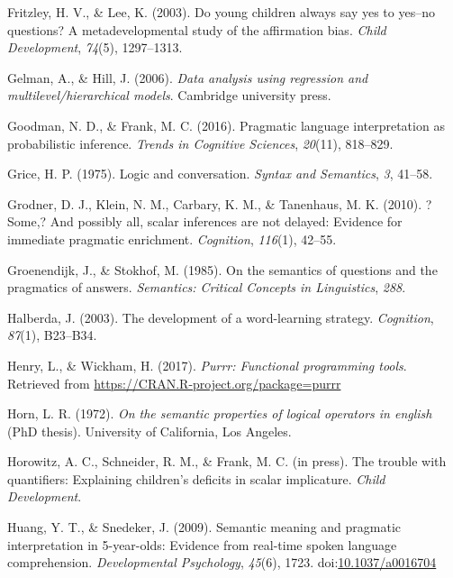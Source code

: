 \documentclass[man]{apa6}
\theoremstyle{definition}
\theoremstyle{definition}
\theoremstyle{definition}
\theoremstyle{remark}
\begin{document}
\hypertarget{ref-fritzley2003young}{}
Fritzley, H. V., \& Lee, K. (2003). Do young children always say yes to
yes--no questions? A metadevelopmental study of the affirmation bias.
\emph{Child Development}, \emph{74}(5), 1297--1313.

\hypertarget{ref-gelman2006data}{}
Gelman, A., \& Hill, J. (2006). \emph{Data analysis using regression and
multilevel/hierarchical models}. Cambridge university press.

\hypertarget{ref-goodman2016}{}
Goodman, N. D., \& Frank, M. C. (2016). Pragmatic language
interpretation as probabilistic inference. \emph{Trends in Cognitive
Sciences}, \emph{20}(11), 818--829.

\hypertarget{ref-grice1975logic}{}
Grice, H. P. (1975). Logic and conversation. \emph{Syntax and
Semantics}, \emph{3}, 41--58.

\hypertarget{ref-grodner2010}{}
Grodner, D. J., Klein, N. M., Carbary, K. M., \& Tanenhaus, M. K.
(2010). ?Some,? And possibly all, scalar inferences are not delayed:
Evidence for immediate pragmatic enrichment. \emph{Cognition},
\emph{116}(1), 42--55.

\hypertarget{ref-groenendijk1985semantics}{}
Groenendijk, J., \& Stokhof, M. (1985). On the semantics of questions
and the pragmatics of answers. \emph{Semantics: Critical Concepts in
Linguistics}, \emph{288}.

\hypertarget{ref-halberda2003development}{}
Halberda, J. (2003). The development of a word-learning strategy.
\emph{Cognition}, \emph{87}(1), B23--B34.

\hypertarget{ref-R-purrr}{}
Henry, L., \& Wickham, H. (2017). \emph{Purrr: Functional programming
tools}. Retrieved from \url{https://CRAN.R-project.org/package=purrr}

\hypertarget{ref-horn1972}{}
Horn, L. R. (1972). \emph{On the semantic properties of logical
operators in english} (PhD thesis). University of California, Los
Angeles.

\hypertarget{ref-horowitzSchneider}{}
Horowitz, A. C., Schneider, R. M., \& Frank, M. C. (in press). The
trouble with quantifiers: Explaining children's deficits in scalar
implicature. \emph{Child Development}.

\hypertarget{ref-huang2009b}{}
Huang, Y. T., \& Snedeker, J. (2009). Semantic meaning and pragmatic
interpretation in 5-year-olds: Evidence from real-time spoken language
comprehension. \emph{Developmental Psychology}, \emph{45}(6), 1723.
doi:\href{https://doi.org/10.1037/a0016704}{10.1037/a0016704}
\end{document}
